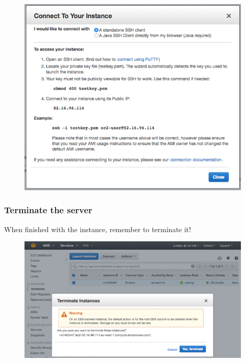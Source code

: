 \begin{figure}[htbp]
\centering
\includegraphics{97Cloud/figures/connect_to_instance.png}
\end{figure}

\begin{Shaded}
\begin{Highlighting}[]
       \KeywordTok{__|}  \KeywordTok{__|_}  \NormalTok{)}
       \KeywordTok{_|} \DataTypeTok{\textbackslash{}(}     \KeywordTok{/}   
      \KeywordTok{___|}\DataTypeTok{\textbackslash{}\textbackslash{}}\KeywordTok{___|___|}

\NormalTok{[} \NormalTok{~]$}
\end{Highlighting}
\end{Shaded}

\subsubsection{Terminate the server}\label{terminate-the-server}

When finished with the instance, remember to terminate it!

\begin{figure}[htbp]
\centering
\includegraphics{97Cloud/figures/terminate_instance.png}
\end{figure}

